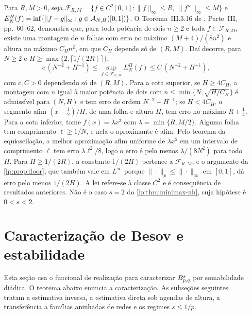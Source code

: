 \documentclass[12pt,a4paper]{article}
\begin{document}
\begin{observacao}
\label{lp:obs:c2-joint}
Para $R,M>0$, seja $\mathcal F_{R,M}=\{f\in C^2[0,1]:\|f\|_\infty\le R,\ \|f''\|_\infty\le M\}$ e $E^H_N(f)=\inf\{\|f-g\|_\infty:g\in\mathcal A_{N,H}([0,1])\}$. O Teorema~III.3.16 de \citet{lp-oliveiravol}, Parte~III, pp.~60--62, demonstra que, para toda potência de dois $n\ge2$ e toda $f\in\mathcal F_{R,M}$, existe uma montagem de $n$ folhas com erro no máximo $(M+4)/(8n^2)$ e altura no máximo $C_Hn^2$, em que $C_H$ depende só de $(R,M)$. Daí decorre, para $N\ge2$ e $H\ge\max\{2,\lceil1/(2R)\rceil\}$,
\[
 c\,(N^{-2}+H^{-1})\le\sup_{f\in\mathcal F_{R,M}}E^H_N(f)\le C\,(N^{-2}+H^{-1}),
\]
com $c,C>0$ dependendo só de $(R,M)$. Para a cota superior, se $H\ge4C_H$, a montagem com $n$ igual à maior potência de dois com $n\le\min\{N,\sqrt{H/C_H}\}$ é admissível para $(N,H)$ e tem erro de ordem $N^{-2}+H^{-1}$; se $H<4C_H$, o segmento afim $(x-\tfrac12)/H$, de uma folha e altura $H$, tem erro no máximo $R+\tfrac14$. Para a cota inferior, tome $f(x)=\lambda x^2$ com $\lambda=\min\{R,M/2\}$. Alguma folha tem comprimento $\ell\ge1/N$, e nela o aproximante é afim. Pelo teorema da equioscilação, a melhor aproximação afim uniforme de $\lambda x^2$ em um intervalo de comprimento $\ell$ tem erro $\lambda\ell^2/8$, logo o erro é pelo menos $\lambda/(8N^2)$ para todo $H$. Para $H\ge1/(2R)$, a constante $1/(2H)$ pertence a $\mathcal F_{R,M}$, e o argumento da \cref{lp:prop:floor}, que também vale em $L^\infty$ porque $\|\cdot\|_p\le\|\cdot\|_\infty$ em $[0,1]$, dá erro pelo menos $1/(2H)$. A lei refere-se à classe $C^2$ e é consequência de resultados anteriores. Não é o caso $s=2$ do \cref{lp:thm:minimax-nh}, cuja hipótese é $0<s<2$.
\end{observacao}

\section{Caracterização de Besov e estabilidade}
\label{lp:sec:statements}

Esta seção usa o funcional de realização para caracterizar $B^{s}_{p,q}$ por somabilidade diádica. O teorema abaixo enuncia a caracterização. As subseções seguintes tratam a estimativa inversa, a estimativa direta sob agendas de altura, a transferência a famílias aninhadas de redes e os regimes $s\le1/p$.
\end{document}
